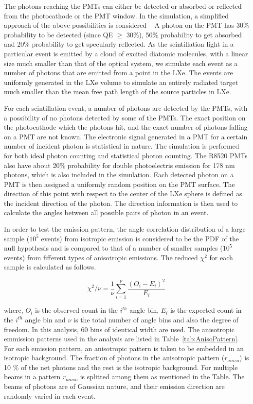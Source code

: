 The photons reaching the PMTs can either be detected or absorbed or reflected from the photocathode 
or the PMT window. In the simulation, a simplified approach of the above possibilities is considered -- 
A photon on the PMT has 30\% probability to be detected (since QE $\geq$ 30\%), 50\% probability to get 
absorbed and 20\% probability to get specularly reflected. As the scintillation light in a particular 
event is emitted by a cloud of excited diatomic molecules, with a linear size much smaller than that 
of the optical system, we simulate each event as a number of photons that are emitted from a point 
in the LXe. The events are uniformly generated in the LXe volume to simulate an entirely radiated 
target much smaller than the mean free path length of the source particles in LXe.

For each scintillation event, a number of photons are detected by the PMTs, with a possibility of 
no photons detected by some of the PMTs. The exact position on the photocathode which the photons hit, 
and the exact number of photons falling on a PMT are not known. The electronic signal generated in a PMT 
for a certain number of incident photon is statistical in nature. The simulation is performed for both 
ideal photon counting and statistical photon counting. The R8520 PMTs also have about 20\% probability 
for double photoelectris emission for 178 nm photons, which is also included in the simulation.
Each detected photon 
on a PMT is then assigned a uniformly random position on the PMT surface. The direction of this point with respect 
to the center of the LXe sphere is defined as the incident direction of the photon. The direction information 
is then used to calculate the angles between all possible pairs of photon in an event.

In order to test the emission pattern, the angle correlation distribution of a large sample ($10^5$ events) 
from isotropic emission is considered to be the PDF of the null hypothesis and is compared 
to that of a number of smaller samples ($10^5$ events) from fifferent types of anisotropic emissions. 
The reduced $\chi^2$ for each sample is calculated as follows.

\begin{equation}
\chi^2/\nu = \frac{1}{\nu} \sum^{\nu}_{i=1} \frac{(O_i - E_i)^2}{E_i}
\label{redchi2}
\end{equation}

where, $O_i$ is the observed count in the $i^{th}$ angle bin, $E_i$ is the expected count in the $i^{th}$ 
angle bin and $\nu$ is the total number of angle bins and also the degree of freedom. In this analysis, 
60 bins of identical width are used. The anisotropic emmission patterns used in the analysis are listed 
in Table~\ref{tab:AnisoPattern}. For each emission pattern,  an anisotropic pattern is taken to be embedded 
in an isotropic background. The fraction of photons in the anisotropic pattern ($r_{aniso}$) is 10 \% of the net photons 
and the rest is the isotropic background. For multiple beams in a pattern $r_{aniso}$ is splitted among them 
as mentioned in the Table. The beams of photons are of Gaussian nature, and their emission direction are 
randomly varied in each event.

